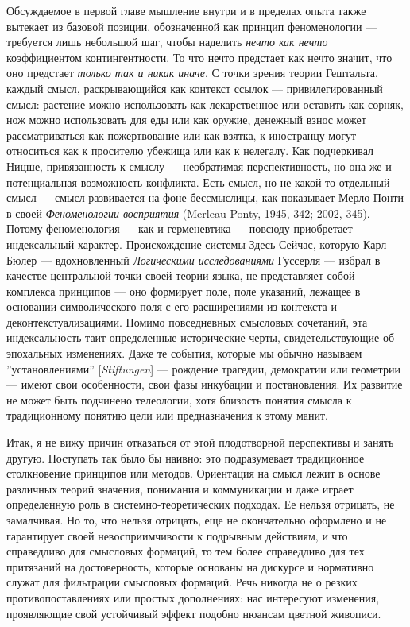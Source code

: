 \documentclass[12pt]{book}
\begin{document}
Обсуждаемое в первой главе мышление внутри и в пределах опыта также вытекает из базовой позиции, обозначенной как принцип феноменологии --- требуется лишь небольшой шаг, чтобы наделить \textit{нечто как нечто} коэффициентом контингентности. То что нечто предстает как нечто значит, что оно предстает \textit{только так и никак иначе}. С точки зрения теории Гештальта, каждый смысл, раскрывающийся как контекст ссылок --- привилегированный смысл: растение можно использовать как лекарственное или оставить как сорняк, нож можно использовать для еды или как оружие, денежный взнос может рассматриваться как пожертвование или как взятка, к иностранцу могут относиться как к просителю убежища или как к нелегалу. Как подчеркивал Ницше, привязанность к смыслу --- необратимая перспективность, но она же и потенциальная возможность конфликта. Есть смысл, но не какой-то отдельный смысл --- смысл развивается на фоне бессмыслицы, как показывает Мерло-Понти в своей \textit{Феноменологии восприятия} (Merleau-Ponty, 1945, 342; 2002, 345). Потому феноменология --- как и герменевтика --- повсюду приобретает индексальный характер. Происхождение системы Здесь-Сейчас, которую Карл Бюлер --- вдохновленный \textit{Логическими исследованиями} Гуссерля --- избрал в качестве центральной точки своей теории языка, не представляет собой комплекса принципов --- оно формирует поле, поле указаний, лежащее в основании символического поля с его расширениями из контекста и деконтекстуализациями. Помимо повседневных смысловых сочетаний, эта индексальность таит определенные исторические черты, свидетельствующие об эпохальных изменениях. Даже те события, которые мы обычно называем ''установлениями'' [\textit{Stiftungen}] --- рождение трагедии, демократии или геометрии --- имеют свои особенности, свои фазы инкубации и постановления. Их развитие не может быть подчинено телеологии, хотя близость понятия смысла к традиционному понятию цели или предназначения к этому манит.

Итак, я не вижу причин отказаться от этой плодотворной перспективы и занять другую. Поступать так было бы наивно: это подразумевает традиционное столкновение принципов или методов. Ориентация на смысл лежит в основе различных теорий значения, понимания и коммуникации и даже играет определенную роль в системно-теоретических подходах. Ее нельзя отрицать, не замалчивая. Но то, что нельзя отрицать, еще не окончательно оформлено и не гарантирует своей невосприимчивости к подрывным действиям, и что справедливо для смысловых формаций, то тем более справедливо для тех притязаний на достоверность, которые основаны на дискурсе и нормативно служат для фильтрации смысловых формаций. Речь никогда не о резких противопоставлениях или простых дополнениях: нас интересуют изменения, проявляющие свой устойчивый эффект подобно нюансам цветной живописи.
\end{document}
